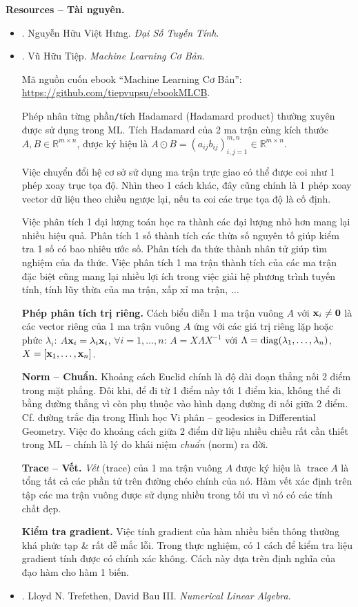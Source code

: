 \documentclass{article}
\begin{document}
\noindent\textbf{\textsf{Resources -- Tài nguyên.}}
\begin{itemize}
	\item \cite{Hung_linear_algebra}. {\sc Nguyễn Hữu Việt Hưng}. {\it Đại Số Tuyến Tính}.
	\item \cite{Tiep_ML_co_ban}. {\sc Vũ Hữu Tiệp}. {\it Machine Learning Cơ Bản}.
	
	Mã nguồn cuốn ebook ``Machine Learning Cơ Bản'': \url{https://github.com/tiepvupsu/ebookMLCB}.
	
	Phép nhân từng phần{\tt/}tích Hadamard (Hadamard product) thường xuyên được sử dụng trong ML. Tích Hadamard của 2 ma trận cùng kích thước $A,B\in\mathbb{R}^{m\times n}$, được ký hiệu là $A\odot B = (a_{ij}b_{ij})_{i,j=1}^{m,n}\in\mathbb{R}^{m\times n}$.
	
	Việc chuyển đổi hệ cơ sở sử dụng ma trận trực giao có thể được coi như 1 phép xoay trục tọa độ. Nhìn theo 1 cách khác, đây cũng chính là 1 phép xoay vector dữ liệu theo chiều ngược lại, nếu ta coi các trục tọa độ là cố định.
	
	Việc phân tích 1 đại lượng toán học ra thành các đại lượng nhỏ hơn mang lại nhiều hiệu quả. Phân tích 1 số thành tích các thừa số nguyên tố giúp kiểm tra 1 số có bao nhiêu ước số. Phân tích đa thức thành nhân tử giúp tìm nghiệm của đa thức. Việc phân tích 1 ma trận thành tích của các ma trận đặc biệt cũng mang lại nhiều lợi ích trong việc giải hệ phương trình tuyến tính, tính lũy thừa của ma trận, xấp xỉ ma trận, $\ldots$
	
	{\bf Phép phân tích trị riêng.} Cách biểu diễn 1 ma trận vuông $A$ với ${\bf x}_i\ne{\bf 0}$ là các vector riêng của 1 ma trận vuông $A$ ứng với các giá trị riêng lặp hoặc phức $\lambda_i$: $A{\bf x}_i = \lambda_i{\bf x}_i$, $\forall i = 1,\ldots,n$: $A = X\Lambda X^{-1}$ với $\Lambda = {\rm diag}(\lambda_1,\ldots,\lambda_n)$, $X = [{\bf x}_1,\ldots,{\bf x}_n]$.
	
	{\bf Norm -- Chuẩn.} Khoảng cách Euclid chính là độ dài đoạn thẳng nối 2 điểm trong mặt phẳng. Đôi khi, để đi từ 1 điểm này tới 1 điểm kia, không thể đi bằng đường thẳng vì còn phụ thuộc vào hình dạng đường đi nối giữa 2 điểm. Cf. đường trắc địa trong Hình học Vi phân -- geodesics in Differential Geometry. Việc đo khoảng cách giữa 2 điểm dữ liệu nhiều chiều rất cần thiết trong ML -- chính là lý do khái niệm {\it chuẩn} (norm) ra đời.
	
	{\bf Trace -- Vết.} {\it Vết} (trace) của 1 ma trận vuông $A$ được ký hiệu là $\operatorname{trace}A$ là tổng tất cả các phần tử trên đường chéo chính của nó. Hàm vết xác định trên tập các ma trận vuông được sử dụng nhiều trong tối ưu vì nó có các tính chất đẹp.
	
	{\bf Kiểm tra gradient.} Việc tính gradient của hàm nhiều biến thông thường khá phức tạp \& rất dễ mắc lỗi. Trong thực nghiệm, có 1 cách để kiểm tra liệu gradient tính được có chính xác không. Cách này dựa trên định nghĩa của đạo hàm cho hàm 1 biến.
	\item \cite{Trefethen_Bau1997,Trefethen_Bau2022}. {\sc Lloyd N. Trefethen, David Bau III}. {\it Numerical Linear Algebra}.
\end{itemize}
\end{document}
